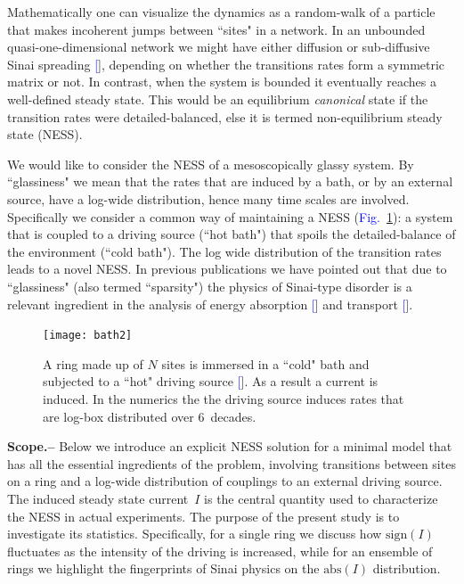 \documentclass[aps,prl,floats,floatfix,twocolumn]{revtex4}
\newcommand{\sect}[1]{{\bf #1.-- }}
\newcommand{\Fig}[1]{\textcolor{blue}{Fig.}\!\!~\ref{#1}}
\renewcommand{\cite}[1]{\textcolor{blue}{[\onlinecite{#1}}]} %
\begin{document}
Mathematically one can visualize the dynamics as a random-walk 
of a particle that makes incoherent jumps between ``sites" in a network.
In an unbounded quasi-one-dimensional network we might have either diffusion 
or sub-diffusive Sinai spreading \cite{sinai}, depending on whether the transitions rates 
form a symmetric matrix or not. In contrast, when the system is bounded 
it eventually reaches a well-defined steady state. 
This would be an equilibrium {\em canonical} state if the transition rates 
were detailed-balanced, else it is termed non-equilibrium steady state (NESS). 

We would like to consider the NESS of a mesoscopically glassy system.
By ``glassiness" we mean that the rates that are induced by a bath, 
or by an external source, have a log-wide distribution, 
hence many time scales are involved. 
Specifically we consider a common way of maintaining a NESS (\Fig{f0}):
a system that is coupled to a driving source (``hot bath") 
that spoils the detailed-balance of the environment (``cold bath"). 
The log wide distribution of the transition rates leads to a novel NESS.
% 
In previous publications we have pointed out that due to ``glassiness" 
(also termed ``sparsity") the physics of Sinai-type disorder is 
a relevant ingredient in the analysis of energy absorption \cite{kbb} 
and transport \cite{ner}.  
   

\begin{figure}
\texttt{[image: bath2]}
\caption{
A ring made up of $N$ sites is immersed in a ``cold" bath 
and subjected to a ``hot" driving source \cite{images}. 
As a result a current is induced.  
%
In the numerics the the driving source induces 
rates that are log-box distributed over 6~decades. 
} 
\label{f0}
\end{figure}



\sect{Scope}
%
% 
Below we introduce an explicit NESS solution for a minimal model that 
has all the essential ingredients of the problem, involving transitions between sites on a ring 
and a log-wide distribution of couplings to an external driving source. 
The induced steady state current~$I$ is the central quantity used to characterize 
the NESS in actual experiments. The purpose of the present study is to investigate 
its statistics. Specifically, for a single ring we discuss how $\text{sign}(I)$ fluctuates    
as the intensity of the driving is increased, while for an ensemble 
of rings we highlight the fingerprints of Sinai physics on the $\text{abs}(I)$ distribution.  
\end{document}
